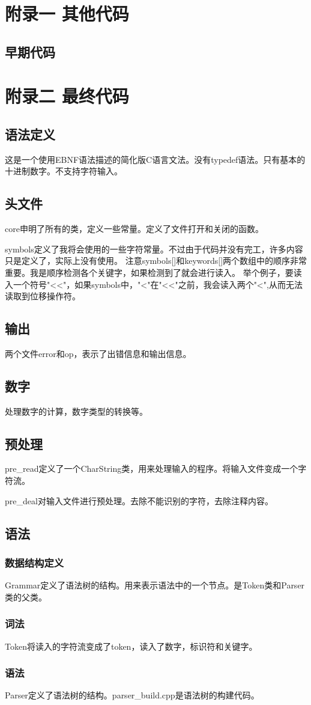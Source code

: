 \documentclass[12pt,a4paper]{ctexrep}
\begin{document}
\chapter{附录一 其他代码}
\section{早期代码}

\chapter{附录二 最终代码}

\section{语法定义}
这是一个使用EBNF语法描述的简化版C语言文法。没有typedef语法。只有基本的十进制数字。不支持字符输入。


\section{头文件}

core申明了所有的类，定义一些常量。定义了文件打开和关闭的函数。\par
symbols定义了我将会使用的一些字符常量。不过由于代码并没有完工，许多内容只是定义了，实际上没有使用。
注意symbols[]和keywords[]两个数组中的顺序非常重要。我是顺序检测各个关键字，如果检测到了就会进行读入。
举个例子，要读入一个符号"<<"，如果symbols中，"<"在"<<"之前，我会读入两个"<",从而无法读取到位移操作符。




\section{输出}
两个文件error和op，表示了出错信息和输出信息。


\section{数字}
处理数字的计算，数字类型的转换等。

\section{预处理}
pre\_read定义了一个CharString类，用来处理输入的程序。将输入文件变成一个字符流。\par
pre\_deal对输入文件进行预处理。去除不能识别的字符，去除注释内容。


\section{语法}
\subsection{数据结构定义}
Grammar定义了语法树的结构。用来表示语法中的一个节点。是Token类和Parser类的父类。

\subsection{词法}
Token将读入的字符流变成了token，读入了数字，标识符和关键字。

\subsection{语法}
Parser定义了语法树的结构。parser\_build.cpp是语法树的构建代码。
\end{document}
